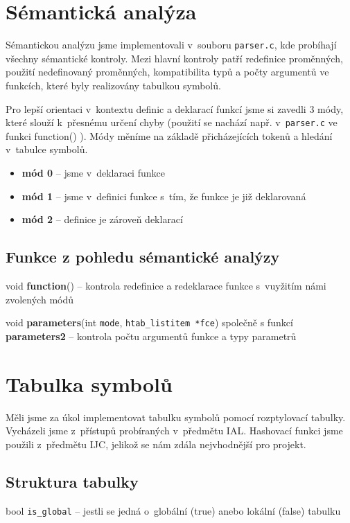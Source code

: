 \documentclass[11pt,a4paper]{article}
\begin{document}
\section{Sémantická analýza}
Sémantickou analýzu jsme implementovali v~souboru \verb|parser.c|, kde probíhají všechny sémantické kontroly. Mezi hlavní kontroly patří redefinice proměnných, použití nedefinovaný proměnných, kompatibilita typů a počty argumentů ve funkcích, které byly realizovány tabulkou symbolů. 

Pro lepší orientaci v~kontextu definic a deklarací funkcí jsme si zavedli 3 módy, které slouží k~přesnému určení chyby (použití se nachází např. v~\verb|parser.c| ve funkci function() ). Módy měníme na základě přicházejících tokenů a hledání v~tabulce symbolů.

\begin{itemize}
\setlength\itemsep{0.3em}
\item \textbf{mód 0} -- jsme v~deklaraci funkce 
\item \textbf{mód 1} -- jsme v~definici funkce s~tím, že funkce je již deklarovaná 
\item \textbf{mód 2} -- definice je zároveň deklarací
\end{itemize}


\subsection{Funkce z pohledu sémantické analýzy}
void \textbf{function}() -- kontrola redefinice a redeklarace funkce s~vuyžitím námi zvolených módů

\noindent
void \textbf{parameters}(int \verb|mode|, \verb|htab_listitem *fce|) společně s funkcí \textbf{parameters2} -- kontrola počtu argumentů funkce a typy parametrů


\section{Tabulka symbolů}
Měli jsme za úkol implementovat tabulku symbolů pomocí rozptylovací tabulky. Vycházeli jsme z~přístupů probíraných v~předmětu IAL. Hashovací funkci jsme použili z~předmětu IJC, jelikož se nám zdála nejvhodnější pro projekt. 

\subsection{Struktura tabulky}

bool \verb|is_global| -- jestli se jedná o~globální (true) anebo lokální (false) tabulku
\end{document}
